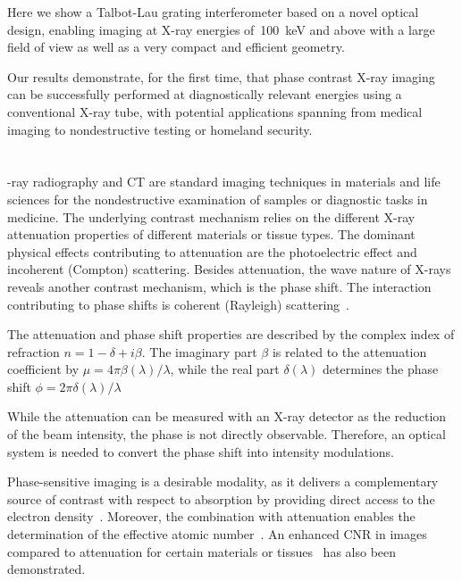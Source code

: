 \documentclass{pnastwo}
\begin{document}
\begin{article}
Here we show a Talbot-Lau grating interferometer based on a novel optical
design, enabling imaging at X-ray energies of~\SI{100}{\kilo\eV} and above
with a large field of view as well as a very compact and efficient geometry. 

Our results demonstrate, for the first time, that phase contrast X-ray
imaging can be successfully performed at diagnostically relevant energies
using a conventional X-ray tube, with potential applications spanning from
medical imaging to nondestructive testing or homeland security.

\section{}
-ray radiography and CT are standard imaging techniques in
materials and life sciences for the nondestructive examination of samples or
diagnostic tasks in medicine. The underlying contrast mechanism
relies on the different X-ray attenuation properties of different materials
or tissue types. The dominant physical effects contributing to attenuation
are the photoelectric effect and incoherent (Compton) scattering. Besides attenuation, the wave
nature of X-rays reveals another contrast mechanism, which is the phase
shift. The interaction contributing to phase shifts is coherent (Rayleigh)
scattering~\cite{Als-Nielsen2011}.

The attenuation and phase shift properties are described by the complex index of refraction
$n=1-\delta + i \beta$.
The imaginary part $\beta$ is related to the
attenuation coefficient by $\mu = 4 \pi
\beta(\lambda) / \lambda$, while the real part
$\delta(\lambda)$ determines the phase shift 
$\phi = 2 \pi \delta(\lambda) / \lambda$

While the attenuation can be measured with an
X-ray detector as the reduction of the beam intensity, the phase
is not directly observable. Therefore, an optical system is needed to
convert the phase shift into intensity modulations.

Phase-sensitive
imaging is a desirable modality, as it delivers a complementary source of
contrast with respect to absorption by providing direct access 
to the electron density~\cite{Als-Nielsen2011}. Moreover, the combination with
attenuation enables the determination of the effective atomic
number~\cite{Qi2010}.
An enhanced
CNR in images compared to attenuation for certain
materials or tissues~\cite{Pfeiffer2007a,McDonald2009} has also been
demonstrated.


\end{article}
\end{document}
